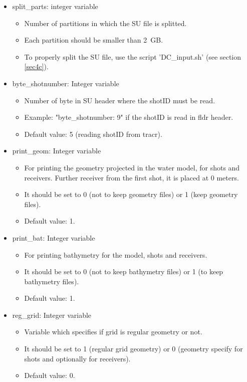 \documentclass[11pt, oneside]{article}   	%
\begin{document}
\begin{itemize}
\item split\_{parts}: integer variable 
	\begin{itemize}
	\item Number of partitions in which the SU file is splitted.
	\item Each partition should be smaller than 2~GB. 
	\item To properly split the SU file, use the script 'DC\_input.sh' (see section \ref{sec4c}).
	\end{itemize}
	

\item {byte\_shotnumber:} Integer variable
	\begin{itemize}
	\item  Number of byte in SU header where the shotID must be read. 
	\item Example: "byte\_shotnumber: 9" if the shotID is read in fldr header.
	\item Default value: 5 (reading shotID from tracr).
	\end{itemize}

\item {print\_geom:} Integer variable
	\begin{itemize}
	\item For printing the geometry projected in the water model, for shots and receivers. Further receiver from the first shot, it is placed at 0 meters.
	\item It should be set to 0 (not to keep geometry files) or 1 (keep geometry files).
	\item Default value: 1.
	\end{itemize}

\item {print\_bat:} Integer variable
	\begin{itemize}
	\item For printing bathymetry for the model, shots and receivers.
	\item It should be set to 0 (not to keep bathymetry files) or 1 (to keep bathymetry files).
	\item Default value: 1.
	\end{itemize}
		
\item {reg\_grid:} Integer variable
	\begin{itemize}
	\item Variable which specifies if grid is regular geometry or not.
	\item It should be set to 1 (regular grid geometry) or 0 (geometry specify for shots and optionally for receivers).
	\item Default value: 0.
	\end{itemize}


\end{itemize}
\end{document}
